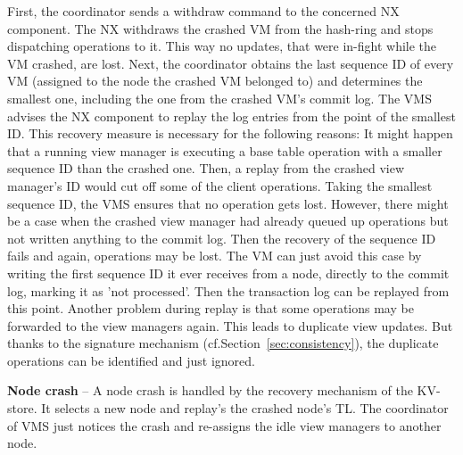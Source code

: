 First, the coordinator sends a withdraw command to the 
concerned NX component. The NX withdraws the crashed VM from the 
hash-ring and stops dispatching operations to it. This way no updates, 
that were in-fight while the VM crashed, are lost. Next, the coordinator 
obtains the last sequence ID of every VM (assigned to the node the 
crashed VM belonged to) and determines the smallest one, including the 
one from the crashed VM's commit log. The VMS advises the NX component 
to replay the log entries from the point of the smallest ID. This 
recovery measure is necessary for the following reasons: It might happen 
that a running view manager is executing a base table operation with a 
smaller sequence ID than the crashed one. Then, a replay from the crashed 
view manager's ID would cut off some of the client operations. Taking 
the smallest sequence ID, the VMS ensures that no operation gets lost.
However, there might be a case when the crashed view manager had already 
queued up operations but not written anything to the commit log.  Then 
the recovery of the sequence ID fails and again, operations may be lost.
The VM can just avoid this case by writing the first sequence ID it ever
receives from a node, directly to the commit log, marking it as 'not 
processed'. Then the transaction log can be replayed from this point. 
Another problem during replay is that some operations may be forwarded 
to the view managers again. This leads to duplicate view updates. 
But thanks to the signature mechanism (cf.Section~\ref{sec:consistency}), 
the duplicate operations can be identified and just ignored. 


\noindent
\textbf{Node crash} -- A node crash is handled by the recovery
mechanism of the KV-store. It selects a new node and replay's the
crashed node's TL. The coordinator of VMS just notices the
crash  and re-assigns the idle view managers to another
node.

